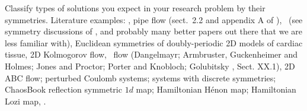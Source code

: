 
 { \label{exer:fludProbsSymms}
Classify types of solutions you expect in your research problem by
their symmetries. Literature examples:
\pCf{},
pipe flow (sect.~2.2 and appendix A of ),
\KS\ (see symmetry discussions of , and
     probably many better papers out there that we are less familiar with),
Euclidean symmetries of doubly-periodic 2D models of cardiac tissue,
2D Kolmogorov flow,
\twomode\ flow (Dangelmayr;
    Armbruster, Guckenheimer and Holmes;
    Jones and Proctor; Porter and Knobloch;
    Golubitsky \etal{}, Sect. XX.1),
2D ABC flow;
perturbed {Coulomb} systems;
systems with discrete symmetries;
ChaosBook %
reflection symmetric $1d$ map;
Hamiltonian H\'enon map;
Hamiltonian Lozi map,
\etc.
    } %


